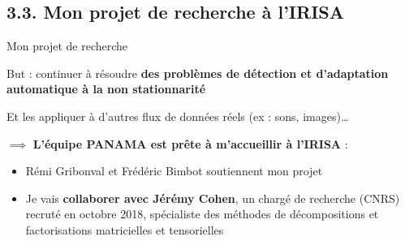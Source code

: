 \documentclass[11pt,english,ignorenonframetext,]{beamer}
\providecommand{\tightlist}{%
  \setlength{\itemsep}{0pt}\setlength{\parskip}{0pt}}
\begin{document}
\subsection{\hfill{}3.3. Mon projet de recherche à l'IRISA\hfill{}}

\begin{frame}{Mon projet de recherche }


But : continuer à résoudre \alert{\textbf{des problèmes de détection et d'adaptation automatique à la non stationnarité}}

Et les appliquer à d'autres flux de données réels (ex : sons, images)\ldots


\vspace*{15pt}
\pause

$\implies$ \textbf{L'équipe PANAMA est prête à m'accueillir à l'IRISA} :
\begin{itemize}
\item
  Rémi Gribonval et Frédéric Bimbot soutiennent mon projet
\pause
\item
  Je vais \textbf{collaborer avec Jérémy Cohen},
  un chargé de recherche (CNRS) recruté en octobre 2018,
  spécialiste des méthodes de décompositions et factorisations matricielles et tensorielles
\end{itemize}




\end{frame}
\end{document}
